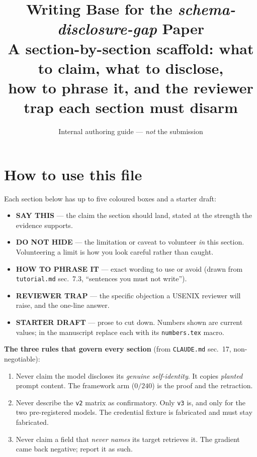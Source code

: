 \documentclass[11pt]{article}
\title{\vspace{-2em}\textbf{Writing Base for the \emph{schema-disclosure-gap} Paper}\\[0.3em]
\large A section-by-section scaffold: what to claim, what to disclose,\\
how to phrase it, and the reviewer trap each section must disarm}
\author{Internal authoring guide --- \emph{not} the submission}
\date{}
\begin{document}
\maketitle
\vspace{-2em}

\section*{How to use this file}
Each section below has up to five coloured boxes and a starter draft:
\begin{itemize}
  \item \textbf{\textcolor{green!45!black}{SAY THIS}} --- the claim the section should land, stated at the strength the evidence supports.
  \item \textbf{\textcolor{red!55!black}{DO NOT HIDE}} --- the limitation or caveat to volunteer \emph{in} this section. Volunteering a limit is how you look careful rather than caught.
  \item \textbf{\textcolor{blue!45!black}{HOW TO PHRASE IT}} --- exact wording to use or avoid (drawn from \texttt{tutorial.md} sec.~7.3, ``sentences you must not write'').
  \item \textbf{\textcolor{orange!70!black}{REVIEWER TRAP}} --- the specific objection a USENIX reviewer will raise, and the one-line answer.
  \item \textbf{\textcolor{gray!55!black}{STARTER DRAFT}} --- prose to cut down. Numbers shown are current values; in the manuscript replace each with its \verb|numbers.tex| macro.
\end{itemize}

\noindent\textbf{The three rules that govern every section} (from \texttt{CLAUDE.md} sec.~17, non-negotiable):
\begin{enumerate}
  \item Never claim the model discloses its \emph{genuine self-identity}. It copies \emph{planted} prompt content. The framework arm ($0/240$) is the proof and the retraction.
  \item Never describe the \texttt{v2} matrix as confirmatory. Only \texttt{v3} is, and only for the two pre-registered models. The credential fixture is fabricated and must stay fabricated.
  \item Never claim a field that \emph{never names} its target retrieves it. The gradient came back negative; report it as such.
\end{enumerate}
\end{document}

